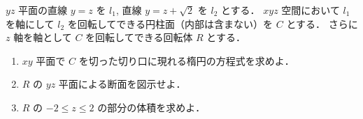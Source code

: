 \documentclass[../../main.tex]{subfiles}
\begin{document}
$yz$ 平面の直線 $y=z$ を $l_1$, 直線 $y=z+\sqrt{2}$ を $l_2$ とする．
$xyz$ 空間において $l_1$ を軸にして $l_2$ を回転してできる円柱面（内部は含まない）を $C$ とする．
さらに $z$ 軸を軸として $C$ を回転してできる回転体 $R$ とする．
\begin{enumerate}
  \item $xy$ 平面で $C$ を切った切り口に現れる楕円の方程式を求めよ．
  \item $R$ の $yz$ 平面による断面を図示せよ．
  \item $R$ の $-2 \le z \le 2$ の部分の体積を求めよ．
\end{enumerate}
\end{document}
